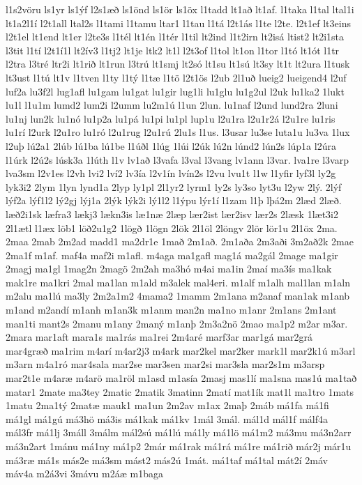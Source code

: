 {l1s2vöru
ls1yr
ls1ýf
l2s1æð
ls1önd
ls1ör
ls1öx
l1tadd
lt1að
lt1af.
l1taka
l1tal
ltal1i
lt1a2l1í
l2t1all
ltal2s
l1tami
l1tamu
ltar1
l1tau
l1tá
l2t1ás
l1te
l2te.
l2t1ef
lt3eins
l2t1el
lt1end
lt1er
l2te3s
l1tél
lt1én
l1tér
l1til
lt2ind
l1t2irn
lt2isá
ltist2
lt2i1sta
l3tit
l1tí
l2t1í1l
lt2ív3
l1tj2
lt1je
ltk2
lt1l
l2t3of
l1tol
lt1on
l1tor
l1tó
lt1ót
l1tr
l2tra
l3tré
ltr2i
lt1rið
lt1run
l3trú
lt1smj
lt2só
lt1su
lt1sú
lt3sy
lt1t
lt2ura
l1tusk
lt3ust
l1tú
lt1v
l1tven
l1ty
l1tý
l1tæ
l1tö
l2t1ös
l2ub
2l1uð
lueig2
lueigend4
l2uf
luf2a
lu3f2l
lug1afl
lu1gam
lu1gat
lu1gir
lug1li
lu1glu
lu1g2ul
l2uk
lu1ka2
1lukt
lu1l
l1u1m
lumd2
lum2i
l2umm
lu2m1ú
l1un
2lun.
lu1naf
l2und
lund2ra
2luni
lu1nj
lun2k
lu1nó
lu1p2a
lu1pá
lu1pi
lu1pl
lup1u
l2u1ra
l2u1r2á
l2u1re
lu1ris
lu1rí
l2urk
l2u1ro
lu1ró
l2u1rug
l2u1rú
2lu1s
l1us.
l3usar
lu3se
luta1u
lu3va
1lux
l2uþ
lú2a1
2lúb
lú1ba
lú1be
l1úðl
1lúg
1lúi
l2úk
lú2n
lúnd2
lún2s
lúp1a
l2úra
l1úrk
l2ú2s
lúsk3a
1lúth
l1v
lv1að
l3vafa
l3val
l3vang
lv1ann
l3var.
lva1re
l3varp
lva3sm
l2v1es
l2vh
lvi2
lví2
lv3ía
l2v1ín
lvín2s
l2vu
lvu1t
l1w
l1yfir
lyf3l
ly2g
lyk3i2
2lym
1lyn
lynd1a
2lyp
ly1pl
2l1yr2
lyrm1
ly2s
ly3so
lyt3u
l2yw
2lý.
2lýf
lýf2a
lýf1l2
lý2gj
lýj1a
2lýk
lýk2i
lý1l2
l1ýpu
lýr1í
l1zam
l1þ
lþá2m
2læd
2læð.
læð2i1sk
læfra3
lækj3
lækn3is
læ1næ
2læp
lær2ist
lær2isv
lær2s
2læsk
1læt3i2
2l1ætl
l1æx
löb1
löð2u1g2
1lögð
1lögn
2lök
2l1öl
2löngv
2lör
lör1u
2l1öx
2ma.
2maa
2mab
2m2ad
madd1
ma2dr1e
1mað
2m1að.
2m1aða
2m3aði
3m2að2k
2mae
2ma1f
m1af.
maf4a
maf2i
m1afl.
m4aga
ma1gafl
mag1á
ma2gál
2mage
ma1gir
2magj
ma1gl
1mag2n
2magö
2m2ah
ma3hó
m4ai
ma1in
2maí
ma3ís
ma1kak
mak1re
ma1kri
2mal
ma1lan
m1ald
m3alek
mal4eri.
m1alf
m1alh
mal1lan
m1aln
m2alu
ma1lú
ma3ly
2m2a1m2
4mama2
1mamm
2m1ana
m2anaf
man1ak
m1anb
m1and
m2andí
m1anh
m1an3k
m1anm
man2n
ma1no
m1anr
2m1ans
2m1ant
man1ti
mant2s
2manu
m1any
2maný
m1anþ
2m3a2nö
2mao
ma1p2
m2ar
m3ar.
2mara
mar1aft
mara1s
ma1rás
ma1rei
2m4aré
marf3ar
mar1gá
mar2grá
mar4græð
ma1rim
m4arí
m4ar2j3
m4ark
mar2kel
mar2ker
mark1l
mar2k1ú
m3arl
m3arn
m4a1ró
mar4sala
mar2se
mar3sen
mar2si
mar3sla
mar2s1m
m3arsp
mar2t1e
m4aræ
m4arö
ma1röl
m1asd
m1asía
2masj
mas1lí
ma1sna
mas1ú
ma1tað
matar1
2mate
ma3tey
2matic
2matik
3matinn
2matí
mat1ík
mat1l
ma1tro
1mats
1matu
2ma1tý
2matæ
mauk1
ma1un
2m2av
m1ax
2maþ
2máb
má1fa
má1fi
má1gl
má1gú
má3hö
má3is
má1kak
má1kv
1mál
3mál.
mál1d
mál1f
málf4a
mál3fr
má1lj
3máll
3málm
mál2sú
má1lú
má1ly
má1lö
má1m2
má3mu
má3n2arr
má3n2art
1mánu
má1ny
má1p2
2már
má1rak
má1rá
má1re
má1rið
már2j
már1u
má3ræ
má1s
más2e
má3sm
mást2
más2ú
1mát.
má1taf
má1tal
mát2í
2máv
máv4a
m2á3vi
3mávu
m2áæ
m1baga
}
